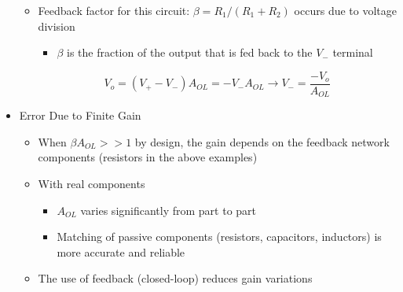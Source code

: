 \begin{itemize}
\begin{itemize}
      \item Feedback factor for this circuit: $\beta=R_1/(R_1+R_2)$ occurs due to voltage division

        \begin{itemize}

          \item $\beta$ is the fraction of the output that is fed back to the $V_-$ terminal

        \end{itemize}

        $$V_o=(V_+-V_-)A_{OL}=-V_-A_{OL}\to V_-=\frac{-V_o}{A_{OL}}$$

    \end{itemize}

  \item Error Due to Finite Gain

    \begin{itemize}

      \item When $\beta A_{OL}>>1$ by design, the gain depends on the feedback network components (resistors in the above examples)

      \item With real components

        \begin{itemize}

          \item $A_{OL}$ varies significantly from part to part

          \item Matching of passive components (resistors, capacitors, inductors) is more accurate and reliable

        \end{itemize}

      \item The use of feedback (closed-loop) reduces gain variations

    \end{itemize}

\end{itemize}



